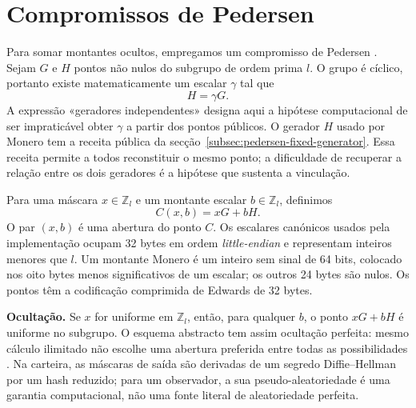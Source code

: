 \section{Compromissos de Pedersen}
\label{pedersen_section}

Para somar montantes ocultos, empregamos um compromisso de Pedersen
\cite{Pedersen1992}. Sejam \(G\) e \(H\) pontos não nulos do subgrupo de ordem
prima \(l\). O grupo é cíclico, portanto existe matematicamente um escalar
\(\gamma\) tal que
\[
 H=\gamma G.
\]
A expressão «geradores independentes» designa aqui a hipótese computacional
de ser impraticável obter \(\gamma\) a partir dos pontos públicos.
O gerador \(H\) usado por Monero tem a receita pública da
secção~\ref{subsec:pedersen-fixed-generator}. Essa receita permite a todos
reconstituir o mesmo ponto; a dificuldade de recuperar a relação entre os
dois geradores é a hipótese que sustenta a vinculação.

%
Para uma máscara \(x\in\mathbb Z_l\) e um montante escalar
\(b\in\mathbb Z_l\), definimos
\begin{equation}
 C(x,b)=xG+bH.
 \label{eq:pedersen-commitment}
\end{equation}
O par \((x,b)\) é uma abertura do ponto \(C\). Os escalares canónicos usados
pela implementação ocupam 32 bytes em ordem \emph{little-endian} e representam
inteiros menores que \(l\). Um montante Monero é um inteiro sem sinal de
64 bits, colocado nos oito bytes menos significativos de um escalar; os outros
24 bytes são nulos. Os pontos têm a codificação comprimida de Edwards de
32 bytes.


\textbf{Ocultação.} Se \(x\) for uniforme em \(\mathbb Z_l\), então, para
qualquer \(b\), o ponto \(xG+bH\) é uniforme no subgrupo. O esquema abstracto
tem assim ocultação perfeita: mesmo cálculo ilimitado não escolhe uma abertura
preferida entre todas as possibilidades \cite{maxwell-ct,
SCOZZAFAVA1993313}. Na carteira, as máscaras de saída são derivadas de um
segredo Diffie--Hellman por um hash reduzido; para um observador, a sua
pseudo-aleatoriedade é uma garantia computacional, não uma fonte literal de
aleatoriedade perfeita.

